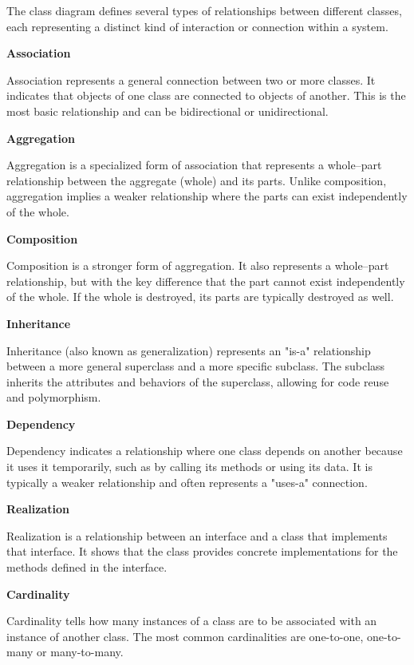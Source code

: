 The class diagram defines several types of relationships between different classes, each representing a distinct kind of interaction or connection within a system.

\textbf{Association}

Association represents a general connection between two or more classes. It indicates that objects of one class are connected to objects of another. This is the most basic relationship and can be bidirectional or unidirectional.

\textbf{Aggregation}

Aggregation is a specialized form of association that represents a whole–part relationship between the aggregate (whole) and its parts. Unlike composition, aggregation implies a weaker relationship where the parts can exist independently of the whole.

\textbf{Composition}

Composition is a stronger form of aggregation. It also represents a whole–part relationship, but with the key difference that the part cannot exist independently of the whole. If the whole is destroyed, its parts are typically destroyed as well.

\textbf{Inheritance}

Inheritance (also known as generalization) represents an "is-a" relationship between a more general superclass and a more specific subclass. The subclass inherits the attributes and behaviors of the superclass, allowing for code reuse and polymorphism.

\textbf{Dependency}

Dependency indicates a relationship where one class depends on another because it uses it temporarily, such as by calling its methods or using its data. It is typically a weaker relationship and often represents a "uses-a" connection.

\textbf{Realization}

Realization is a relationship between an interface and a class that implements that interface. It shows that the class provides concrete implementations for the methods defined in the interface.

\textbf{Cardinality}

Cardinality tells how many instances of a class are to be associated with an instance of another class. The most common cardinalities are one-to-one, one-to-many or many-to-many.



